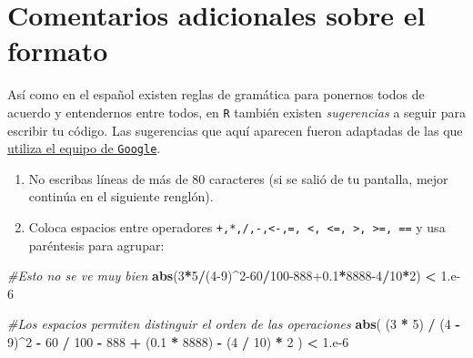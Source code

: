 \documentclass[
]{book}
\newenvironment{Shaded}{\begin{snugshade}}{\end{snugshade}}
\newcommand{\CommentTok}[1]{\textcolor[rgb]{0.56,0.35,0.01}{\textit{#1}}}
\newcommand{\DecValTok}[1]{\textcolor[rgb]{0.00,0.00,0.81}{#1}}
\newcommand{\FloatTok}[1]{\textcolor[rgb]{0.00,0.00,0.81}{#1}}
\newcommand{\KeywordTok}[1]{\textcolor[rgb]{0.13,0.29,0.53}{\textbf{#1}}}
\newcommand{\NormalTok}[1]{#1}
\newcommand{\OperatorTok}[1]{\textcolor[rgb]{0.81,0.36,0.00}{\textbf{#1}}}
\newcommand{\StringTok}[1]{\textcolor[rgb]{0.31,0.60,0.02}{#1}}
\begin{document}
\hypertarget{comentarios-adicionales-sobre-el-formato}{%
\section{Comentarios adicionales sobre el formato}\label{comentarios-adicionales-sobre-el-formato}}

Así como en el español existen reglas de gramática para ponernos todos de acuerdo y entendernos entre todos, en \texttt{R} también existen \emph{sugerencias} a seguir para escribir tu código. Las sugerencias que aquí aparecen fueron adaptadas de las que \href{https://google.github.io/styleguide/Rguide.xml}{utiliza el equipo de \texttt{Google}}.

\begin{enumerate}
\def\labelenumi{\arabic{enumi}.}
\item
  No escribas líneas de más de 80 caracteres (si se salió de tu pantalla, mejor continúa en el siguiente renglón).
\item
  Coloca espacios entre operadores \texttt{+,*,/,-,\textless{}-,=,\ \textless{},\ \textless{}=,\ \textgreater{},\ \textgreater{}=,\ ==} y usa paréntesis para agrupar:
\end{enumerate}

\begin{Shaded}
\begin{Highlighting}[]
\CommentTok{#Esto no se ve muy bien}
\KeywordTok{abs}\NormalTok{(}\DecValTok{3}\OperatorTok{*}\DecValTok{5}\OperatorTok{/}\NormalTok{(}\DecValTok{4-9}\NormalTok{)}\OperatorTok{^}\DecValTok{2-60}\OperatorTok{/}\DecValTok{100-888}\FloatTok{+0.1}\OperatorTok{*}\DecValTok{8888-4}\OperatorTok{/}\DecValTok{10}\OperatorTok{*}\DecValTok{2}\NormalTok{) }\OperatorTok{<}\StringTok{ }\DecValTok{1}\NormalTok{.e}\DecValTok{-6}

\CommentTok{#Los espacios permiten distinguir el orden de las operaciones}
\KeywordTok{abs}\NormalTok{( (}\DecValTok{3} \OperatorTok{*}\StringTok{ }\DecValTok{5}\NormalTok{) }\OperatorTok{/}\StringTok{ }\NormalTok{(}\DecValTok{4} \OperatorTok{-}\StringTok{ }\DecValTok{9}\NormalTok{)}\OperatorTok{^}\DecValTok{2} \OperatorTok{-}\StringTok{ }\DecValTok{60} \OperatorTok{/}\StringTok{ }\DecValTok{100} \OperatorTok{-}\StringTok{ }\DecValTok{888} 
      \OperatorTok{+}\StringTok{ }\NormalTok{(}\FloatTok{0.1} \OperatorTok{*}\StringTok{ }\DecValTok{8888}\NormalTok{) }\OperatorTok{-}\StringTok{ }\NormalTok{(}\DecValTok{4} \OperatorTok{/}\StringTok{ }\DecValTok{10}\NormalTok{) }\OperatorTok{*}\StringTok{ }\DecValTok{2}\NormalTok{ ) }\OperatorTok{<}\StringTok{ }\DecValTok{1}\NormalTok{.e}\DecValTok{-6}
\end{Highlighting}
\end{Shaded}
\end{document}
